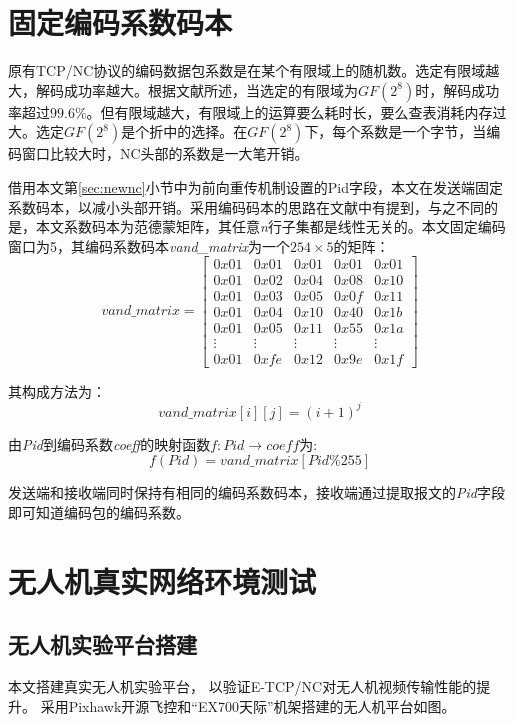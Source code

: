 \section{固定编码系数码本}
原有TCP/NC协议的编码数据包系数是在某个有限域上的随机数。选定有限域越大，解码成功率越大。根据文献\cite{4015738}所述，当选定的有限域为$GF\left(2^8\right)$时，解码成功率超过$99.6\%$。但有限域越大，有限域上的运算要么耗时长，要么查表消耗内存过大。选定$GF\left(2^8\right)$是个折中的选择。在$GF\left(2^8\right)$下，每个系数是一个字节，当编码窗口比较大时，NC头部的系数是一大笔开销。
\par
借用本文第\ref{sec:newnc}小节中为前向重传机制设置的Pid字段，本文在发送端固定系数码本，以减小头部开销。采用编码码本的思路在文献\cite{宋蒙2015基于网络编码的}中有提到，与之不同的是，本文系数码本为范德蒙矩阵，其任意\emph{n}行子集都是线性无关的。本文固定编码窗口为5，其编码系数码本\emph{vand\_matrix}为一个$254 \times 5$的矩阵：
\begin{equation}
	vand\_matrix=\left[ {\begin{array}{*{20}{c}}
		{0x01}&{0x01}&{0x01}&{0x01}&{0x01}\\
		{0x01}&{0x02}&{0x04}&{0x08}&{0x10}\\
		{0x01}&{0x03}&{0x05}&{0x0f}&{0x11}\\
		{0x01}&{0x04}&{0x10}&{0x40}&{0x1b}\\
		{0x01}&{0x05}&{0x11}&{0x55}&{0x1a}\\
		{\vdots}&{\vdots}&{\vdots}&{\vdots}&{\vdots}\\
		{0x01}&{0xfe}&{0x12}&{0x9e}&{0x1f}
		\end{array}} \right]
\end{equation}
\par
其构成方法为：
\begin{equation}
	vand\_matrix[i][j]=(i+1)^j
\end{equation}
\par
由\emph{Pid}到编码系数\emph{coeff}的映射函数$f:Pid \rightarrow coeff$为:
\begin{equation}
	f(Pid)=vand\_matrix[Pid\%255]
\end{equation}
\par
发送端和接收端同时保持有相同的编码系数码本，接收端通过提取报文的\emph{Pid}字段即可知道编码包的编码系数。
\section{无人机真实网络环境测试}
\subsection{无人机实验平台搭建}
本文搭建真实无人机实验平台，
以验证E-TCP/NC对无人机视频传输性能的提升。
采用Pixhawk开源飞控和“EX700天际”机架搭建的无人机平台如图。
